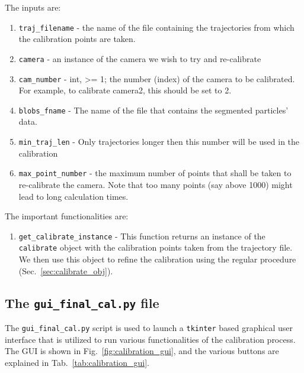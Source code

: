 \documentclass[10pt,a4paper]{article}
\begin{document}
The inputs are:

\begin{enumerate}
	\item \texttt{traj\_filename} - the name of the file containing the trajectories from
	which the calibration points are taken.
	
	\item \texttt{camera} - an instance of the camera we wish to try and re-calibrate
	
	\item \texttt{cam\_number} - int, >= 1; the number (index) of the camera to be
	calibrated. For example, to calibrate camera2, this should be set to 2.
	
	\item \texttt{blobs\_fname} - The name of the file that contains the segmented 
	particles' data.
	
	\item \texttt{min\_traj\_len} - Only trajectories longer then this number will be used in the calibration
	
	\item \texttt{max\_point\_number} - the maximum number of points that shall be taken
	to re-calibrate the camera. Note that too many points (say above 1000) might lead to long calculation times. 
\end{enumerate}


The important functionalities are:

\begin{enumerate}
	
	\item \texttt{get\_calibrate\_instance} - This function returns an instance of the \texttt{calibrate} object with the calibration points taken from the trajectory file. We then use this object to refine the calibration using the regular procedure (Sec.~\ref{sec:calibrate_obj}).

\end{enumerate}





\subsection{The \texttt{gui\_final\_cal.py} file}

The \texttt{gui\_final\_cal.py} script is used to launch a \texttt{tkinter} based graphical user interface that is utilized to run various functionalities of the calibration process. The GUI is shown in  Fig.~\ref{fig:calibration_gui}, and the various buttons are explained in Tab.~\ref{tab:calibration_gui}.
\end{document}
